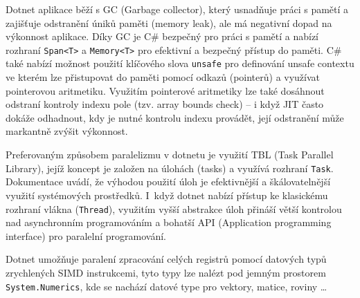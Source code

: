 Dotnet aplikace běží s GC (Garbage collector), který usnadňuje práci s pamětí a zajišťuje odstranění úniků paměti (memory leak), ale má negativní dopad na výkonnost aplikace. Díky GC je C\# bezpečný pro práci s pamětí a nabízí rozhraní \texttt{Span<T>} a \texttt{Memory<T>} pro efektivní a bezpečný přístup do paměti. C\# také nabízí možnost použití klíčového slova \texttt{unsafe} pro definování unsafe contextu ve kterém lze přistupovat do paměti  pomocí odkazů (pointerů) a využívat pointerovou aritmetiku. Využitím pointerové aritmetiky lze také dosáhnout odstraní kontroly indexu pole (tzv. array bounds check) -- i když JIT často dokáže odhadnout, kdy je nutné kontrolu indexu provádět, její odstranění může markantně zvýšit výkonnost. 

Preferovaným způsobem paralelizmu v dotnetu je využití TBL (Task Parallel Library), jejíž koncept je založen na úlohách (tasks) a využívá rozhraní \texttt{Task}. Dokumentace \cite{dotnet_doc:tbl} uvádí, že výhodou použití úloh je efektivnější a škálovatelnější využití systémových prostředků. I~když dotnet nabízí přístup ke klasickému rozhraní vlákna (\texttt{Thread}), využitím vyšší abstrakce úloh přináší větší kontrolou nad asynchronním programováním a bohatší API (Application programming interface) pro paralelní programování. 

Dotnet umožňuje paralení zpracování celých registrů pomocí datových typů zrychlených SIMD instrukcemi, tyto typy lze nalézt pod jemným prostorem \texttt{System.Numerics}, kde se nachází datové type pro vektory, matice, roviny \dots

